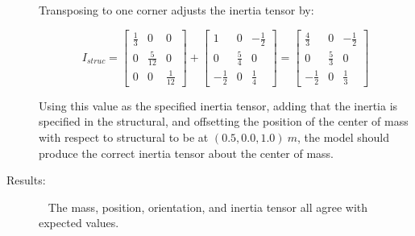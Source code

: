 \begin{description}
Transposing to one corner adjusts the inertia tensor by:

\begin{equation*}
I_{struc} =
   \begin{bmatrix} \frac{1}{3} & 0   & 0  \\
                   0   & \frac{5}{12} & 0   \\
                   0  & 0   & \frac{1}{12}
   \end{bmatrix}
   +
   \begin{bmatrix} 1 & 0   & -\frac{1}{2}  \\
                   0   & \frac{5}{4} & 0   \\
                   -\frac{1}{2} & 0   & \frac{1}{4}
   \end{bmatrix}
   =
   \begin{bmatrix} \frac{4}{3} & 0   & -\frac{1}{2}  \\
                   0   & \frac{5}{3} & 0   \\
                   -\frac{1}{2} & 0   & \frac{1}{3}
   \end{bmatrix}
\end{equation*}

Using this value as the specified inertia tensor, adding that the inertia is
specified in the structural, and offsetting the position of the center of mass
with respect to structural to be at $(0.5, 0.0, 1.0)~m$, the model should
produce the correct inertia tensor about the center of mass.

\item[Results:]\ \newline
The mass, position, orientation, and inertia tensor all agree with expected
values.
\end{description}








